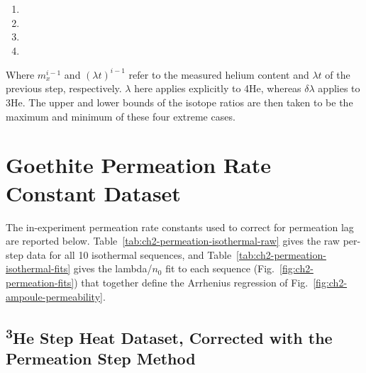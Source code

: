 \begin{enumerate}
\item {}
\item {}
\item {}
\item {}
\end{enumerate}

Where $m_{x}^{i-1}$ and $\left(\lambda t \right)^{i-1}$ refer to the measured helium content and $\lambda t$ of the previous step, respectively. $\lambda$ here applies explicitly to 4He, whereas $\delta \lambda$ applies to 3He. The upper and lower bounds of the isotope ratios are then taken to be the maximum and minimum of these four extreme cases.

\clearpage

\section{Goethite Permeation Rate Constant Dataset}\label{sec:ch2-si-detailed-methods}

The in-experiment permeation rate constants used to correct for permeation lag are reported below. Table~\ref{tab:ch2-permeation-isothermal-raw} gives the raw per-step data for all 10 isothermal sequences, and Table~\ref{tab:ch2-permeation-isothermal-fits} gives the lambda/$n_0$ fit to each sequence (Fig.~\ref{fig:ch2-permeation-fits}) that together define the Arrhenius regression of Fig.~\ref{fig:ch2-ampoule-permeability}.

\ChTwoPermStepRawTable

\clearpage

\ChTwoPermStepFitTable

\subsection*{\textsuperscript{3}He Step Heat Dataset, Corrected with the Permeation Step Method}\label{ch2-si-distilled-permstep}

